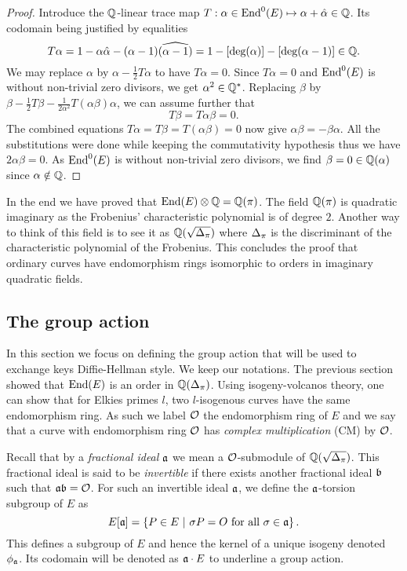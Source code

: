 \documentclass[../main/main.tex]{subfiles}
\begin{document}
\begin{proof}
	Introduce the $\mathbb{Q}$-linear trace map $T:\alpha\in\text{End}^0(E) \mapsto \alpha + \hat{\alpha}\in\mathbb{Q}$.
	Its codomain being justified by equalities
	\[T\alpha = 1 - \alpha\hat{\alpha} -(\alpha-1)\widehat{(\alpha-1)} = 1-[\text{deg}(\alpha)] - [\text{deg}(\alpha-1)]\in\mathbb{Q}.\]
	We may replace $\alpha$ by $\alpha-\frac{1}{2}T\alpha$ to have $T\alpha = 0$.
	Since $T\alpha=0$ and $\text{End}^0(E)$ is without non-trivial zero divisors, we get $\alpha^2\in\mathbb{Q}^{*}$.
	Replacing $\beta$ by $\beta-\frac{1}{2}T\beta-\frac{1}{2\alpha^2}T(\alpha\beta)\alpha$, we can assume further that
	\[
		T\beta = T\alpha\beta = 0.
	\]
	The combined equations $T\alpha=T\beta=T(\alpha\beta)=0$ now give $\alpha\beta = -\beta\alpha$.
	All the substitutions were done while keeping the commutativity hypothesis thus we have $2\alpha\beta=0$.
	As $\text{End}^0(E)$ is without non-trivial zero divisors, we find $\beta=0\in\mathbb{Q}(\alpha)$ since $\alpha\notin\mathbb{Q}$.
\end{proof}
In the end we have proved that $\text{End}(E)\otimes\mathbb{Q} = \mathbb{Q}(\pi)$.
The field $\mathbb{Q}(\pi)$ is quadratic imaginary as the Frobenius' characteristic polynomial is of degree $2$.
Another way to think of this field is to see it as $\mathbb{Q}(\sqrt{\Delta_{\pi}})$ where $\Delta_{\pi}$ is the discriminant of the characteristic polynomial of the Frobenius.
This concludes the proof that ordinary curves have endomorphism rings isomorphic to orders in imaginary quadratic fields.

\subsection{The group action}
In this section we focus on defining the group action that will be used to exchange keys Diffie-Hellman style.
We keep our notations.
The previous section showed that $\text{End}(E)$ is an order in $\mathbb{Q}(\Delta_{\pi})$.
Using isogeny-volcanos theory, one can show that for Elkies primes $l$, two $l$-isogenous curves have the same endomorphism ring.
As such we label $\mathcal{O}$ the endomorphism ring of $E$ and we say that a curve with endomorphism ring $\mathcal{O}$ has \textit{complex multiplication} (CM) by $\mathcal{O}$.

Recall that by a \textit{fractional ideal} $\mathfrak{a}$ we mean a $\mathcal{O}$-submodule of $\mathbb{Q}(\sqrt{\Delta_{\pi}})$.
This fractional ideal is said to be \textit{invertible} if there exists another fractional ideal $\mathfrak{b}$ such that $\mathfrak{a}\mathfrak{b} = \mathcal{O}$.
For such an invertible ideal $\mathfrak{a}$, we define the $\mathfrak{a}$-torsion subgroup of $E$ as
\[
	E[\mathfrak{a}] = \left\{ P\in E\ |\ \sigma P = O \text{ for all } \sigma\in\mathfrak{a}\right\}.
\]
This defines a subgroup of $E$ and hence the kernel of a unique isogeny denoted $\phi_{\mathfrak{a}}$.
Its codomain will be denoted as $\mathfrak{a}\cdot E$ to underline a group action.
\end{document}
